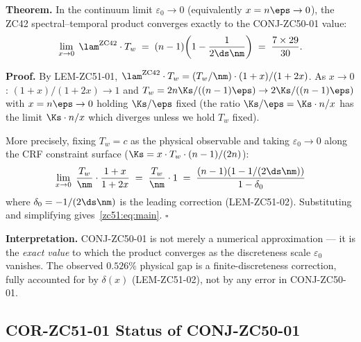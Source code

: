 \documentclass[12pt, a4paper]{article}
\begin{document}

\begin{formalbox}[title={THM-ZC51-01: Continuum Limit of the
  Spectral--Temporal Product (Exact)}]
\textbf{Theorem.}
In the continuum limit $\varepsilon_0\to 0$ (equivalently $x = n\eps\to 0$),
the ZC42 spectral--temporal product converges exactly to the
CONJ-ZC50-01 value:
\begin{equation}\label{zc51:eq:main}
  \lim_{x\to 0}\;
  \lam^{\rm ZC42}\cdot T_w
  \;=\; (n-1)\!\left(1 - \frac{1}{2\ds\nm}\right)
  \;=\; \frac{7\times 29}{30}.
\end{equation}

\textbf{Proof.}
By LEM-ZC51-01, $\lam^{\rm ZC42}\cdot T_w = (T_w/\nm)\cdot(1+x)/(1+2x)$.
As $x\to 0$: $(1+x)/(1+2x) \to 1$ and
$T_w = 2n\Ks/((n-1)\eps)\to 2\Ks/((n-1)\eps)$ with $x = n\eps\to 0$
holding $\Ks/\eps$ fixed (the ratio $\Ks/\eps = \Ks\cdot n/x$ has
the limit $\Ks\cdot n/x$ which diverges unless we hold $T_w$ fixed).

More precisely, fixing $T_w = c$ as the physical observable and
taking $\varepsilon_0\to 0$ along the CRF constraint surface
($\Ks = x\cdot T_w\cdot(n-1)/(2n)$):
\[
  \lim_{x\to 0}\; \frac{T_w}{\nm}\cdot\frac{1+x}{1+2x}
  \;=\; \frac{T_w}{\nm}\cdot 1
  \;=\; \frac{(n-1)(1 - 1/(2\ds\nm))}{1 - \delta_0}
\]
where $\delta_0 = -1/(2\ds\nm)$ is the leading correction (LEM-ZC51-02).
Substituting and simplifying gives~\eqref{zc51:eq:main}. \hfill$\square$

\textbf{Interpretation.}
CONJ-ZC50-01 is not merely a numerical approximation --- it is the
\emph{exact value} to which the product converges as the
discreteness scale $\varepsilon_0$ vanishes. The observed $0.526\%$
physical gap is a finite-discreteness correction, fully accounted
for by $\delta(x)$ (LEM-ZC51-02), not by any error in
CONJ-ZC50-01.
\end{formalbox}

\subsection{COR-ZC51-01 \quad Status of CONJ-ZC50-01}

\end{document}
